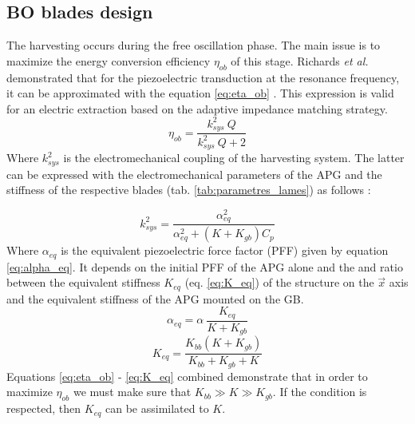 \documentclass[3p,twocolumn,preprint]{elsarticle}
\begin{document}
	\subsection{BO blades design}	
	\label{subsec:BO blades design}
The harvesting occurs during the free oscillation phase. The main issue is to maximize the energy conversion efficiency $\eta_{ob}$ of this stage. Richards \emph{et al.} demonstrated that for the piezoelectric transduction at the resonance frequency, it can be approximated with the equation \ref{eq:eta_ob} \cite{Richards2004}. This expression is valid for an electric extraction based on the adaptive impedance matching strategy.
\begin{equation}
	\eta_{ob} = \dfrac{k^2_{sys}\ Q}{k^2_{sys}\ Q + 2}
	\label{eq:eta_ob}
\end{equation}
Where $k^2_{sys}$ is the electromechanical coupling of the harvesting system. The latter can be expressed with the electromechanical parameters of the APG and the stiffness of the respective blades (tab. \ref{tab:parametres_lames}) as follows :

\begin{equation}
	k^2_{sys} = \dfrac{\alpha^2_{eq}}{\alpha^2_{eq} + (K+K_{gb})C_p}
	\label{eq:k2_sys}
\end{equation}
Where $\alpha_{eq}$ is the equivalent piezoelectric force factor (PFF) given by equation \ref{eq:alpha_eq}. It depends on the initial PFF of the APG alone and the and ratio between the equivalent stiffness $K_{eq}$ (eq. \ref{eq:K_eq}) of the structure on the $\vec{x}$ axis and the equivalent stiffness of the APG mounted on the GB.
\begin{equation}
	\alpha_{eq} = \alpha\ \dfrac{K_{eq}}{K + K_{gb}} 
	\label{eq:alpha_eq}
\end{equation}
\begin{equation}
	K_{eq} = \dfrac{K_{bb}(K + K_{gb})}{K_{bb} + K_{gb} + K}
	\label{eq:K_eq}
\end{equation}
Equations \ref{eq:eta_ob} - \ref{eq:K_eq} combined demonstrate that in order to maximize $\eta_{ob}$ we must make sure that $K_{bb} \gg K \gg K_{gb}$. If the condition is respected, then $K_{eq}$ can be assimilated to $K$. 
\end{document}

